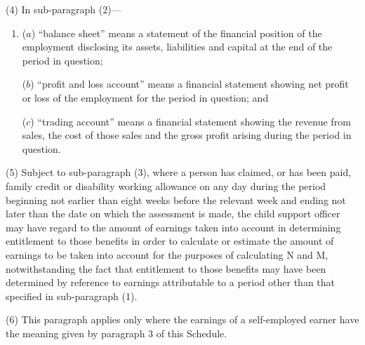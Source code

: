 \documentclass[12pt,a4paper]{article}
\begin{document}
(4) In sub-paragraph (2)—
\begin{enumerate}\item[]
($a$) “balance sheet” means a statement of the financial position of the employment disclosing its assets, liabilities and capital at the end of the period in question;

($b$) “profit and loss account” means a financial statement showing net profit or loss of the employment for the period in question; and

($c$) “trading account” means a financial statement showing the revenue from sales, the cost of those sales and the gross profit arising during the period in question.
\end{enumerate}

(5) Subject to sub-paragraph (3), where a person has claimed, or has been paid, family credit or disability working allowance on any day during the period beginning not earlier than eight weeks before the relevant week and ending not later than the date on which the assessment is made, the child support officer may have regard to the amount of earnings taken into account in determining entitlement to those benefits in order to calculate or estimate the amount of earnings to be taken into account for the purposes of calculating N and M, notwithstanding the fact that entitlement to those benefits may have been determined by reference to earnings attributable to a period other than that specified in sub-paragraph (1).

(6) This paragraph applies only where the earnings of a self-employed earner have the meaning given by paragraph 3 of this Schedule.

\end{document}
